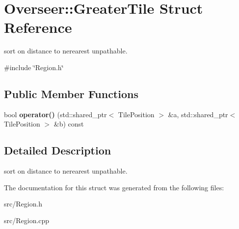 \hypertarget{structOverseer_1_1GreaterTile}{}\section{Overseer\+:\+:Greater\+Tile Struct Reference}
\label{structOverseer_1_1GreaterTile}


sort on distance to nerearest unpathable.  




{\ttfamily \#include \char`\"{}Region.\+h\char`\"{}}

\subsection*{Public Member Functions}
\begin{DoxyCompactItemize}
\item 
bool {\bfseries operator()} (std\+::shared\+\_\+ptr$<$ Tile\+Position $>$ \&a, std\+::shared\+\_\+ptr$<$ Tile\+Position $>$ \&b) const \hypertarget{structOverseer_1_1GreaterTile_a7df65c34af87144d96c17ffbedc5510d}{}\label{structOverseer_1_1GreaterTile_a7df65c34af87144d96c17ffbedc5510d}

\end{DoxyCompactItemize}


\subsection{Detailed Description}
sort on distance to nerearest unpathable. 

The documentation for this struct was generated from the following files\+:\begin{DoxyCompactItemize}
\item 
src/Region.\+h\item 
src/Region.\+cpp\end{DoxyCompactItemize}
